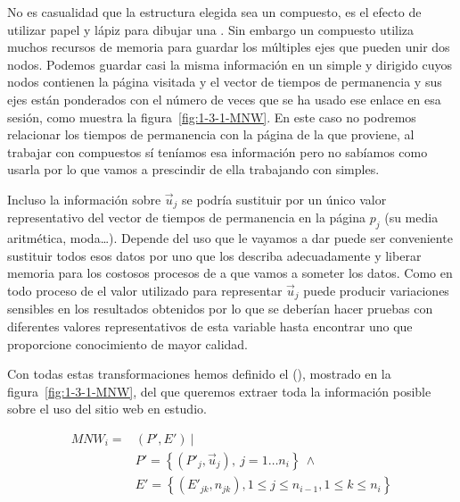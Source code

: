 No es casualidad que la estructura elegida sea un \grafo compuesto, es el efecto de utilizar papel y lápiz para dibujar una \sn. Sin embargo un \grafo compuesto utiliza muchos recursos de memoria para guardar los múltiples ejes que pueden unir dos nodos. Podemos guardar casi la misma información en un \grafo simple y dirigido cuyos nodos contienen la página visitada y el vector de tiempos de permanencia y sus ejes están ponderados con el número de veces que se ha usado ese enlace en esa sesión, como muestra la figura~\ref{fig:1-3-1-MNW}. En este caso no podremos relacionar los tiempos de permanencia con la página de la que proviene, al trabajar con \grafos compuestos sí teníamos esa información pero no sabíamos como usarla por lo que vamos a prescindir de ella trabajando con \grafos simples.

Incluso la información sobre $\overrightarrow{u}_j$ se podría sustituir por un único valor representativo del vector de tiempos de permanencia en la página $p_j$ (su media aritmética, moda\ldots). Depende del uso que le vayamos a dar puede ser conveniente sustituir todos esos datos por uno que los describa adecuadamente y liberar memoria para los costosos procesos de \dm a que vamos a someter los datos. Como en todo proceso de \KDD el valor utilizado para representar $\overrightarrow{u}_j$ puede producir variaciones sensibles en los resultados obtenidos por lo que se deberían hacer pruebas con diferentes valores representativos de esta variable hasta encontrar uno que proporcione conocimiento de mayor calidad.

Con todas estas transformaciones hemos definido el \mnw (\MNW), mostrado en la figura~\ref{fig:1-3-1-MNW}, del que queremos extraer toda la información posible sobre el uso del sitio web en estudio.

\begin{Definition}\label{def:1-3-1-MNW}
  \begin{equation}\label{eq:1-3-1-MNW}
     \begin{array}{ll}
        MNW_i = & \left( P', E' \right) \ | \\
              & P' = \left\{ \left(P'_j, \overrightarrow{u}_j \right),\ j = 1\ldots n_i \right\} \ \wedge \\
              & E' = \left\{ \left( E'_{jk}, n_{jk} \right), 1 \leq j \leq n_{i-1}, 1 \leq k \leq n_i \right\} 
     \end{array}
  \end{equation}
\end{Definition}


